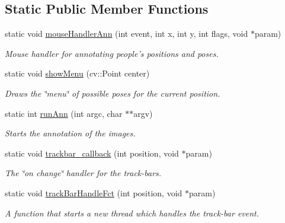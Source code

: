 \subsection*{Static Public Member Functions}
\begin{DoxyCompactItemize}
\item 
\hypertarget{classannotatePosPose_a2c3529417ce5c15e00e8bd8679a4db27}{
static void \hyperlink{classannotatePosPose_a2c3529417ce5c15e00e8bd8679a4db27}{mouseHandlerAnn} (int event, int x, int y, int flags, void $\ast$param)}
\label{classannotatePosPose_a2c3529417ce5c15e00e8bd8679a4db27}

\begin{DoxyCompactList}\small\item\em Mouse handler for annotating people's positions and poses. \item\end{DoxyCompactList}\item 
\hypertarget{classannotatePosPose_a2510d1948d3138df3331c91ddcd49b95}{
static void \hyperlink{classannotatePosPose_a2510d1948d3138df3331c91ddcd49b95}{showMenu} (cv::Point center)}
\label{classannotatePosPose_a2510d1948d3138df3331c91ddcd49b95}

\begin{DoxyCompactList}\small\item\em Draws the \char`\"{}menu\char`\"{} of possible poses for the current position. \item\end{DoxyCompactList}\item 
\hypertarget{classannotatePosPose_a226e4ef5f47790d98002d2567659a62e}{
static int \hyperlink{classannotatePosPose_a226e4ef5f47790d98002d2567659a62e}{runAnn} (int argc, char $\ast$$\ast$argv)}
\label{classannotatePosPose_a226e4ef5f47790d98002d2567659a62e}

\begin{DoxyCompactList}\small\item\em Starts the annotation of the images. \item\end{DoxyCompactList}\item 
\hypertarget{classannotatePosPose_ac8d0365f010294def2757bf31ba1207f}{
static void \hyperlink{classannotatePosPose_ac8d0365f010294def2757bf31ba1207f}{trackbar\_\-callback} (int position, void $\ast$param)}
\label{classannotatePosPose_ac8d0365f010294def2757bf31ba1207f}

\begin{DoxyCompactList}\small\item\em The \char`\"{}on change\char`\"{} handler for the track-\/bars. \item\end{DoxyCompactList}\item 
\hypertarget{classannotatePosPose_a6449c025574a5b0aae30a9b38fe598d6}{
static void \hyperlink{classannotatePosPose_a6449c025574a5b0aae30a9b38fe598d6}{trackBarHandleFct} (int position, void $\ast$param)}
\label{classannotatePosPose_a6449c025574a5b0aae30a9b38fe598d6}

\begin{DoxyCompactList}\small\item\em A function that starts a new thread which handles the track-\/bar event. \item\end{DoxyCompactList}\end{DoxyCompactItemize}
